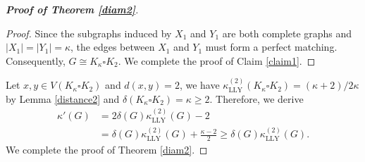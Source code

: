 \documentclass[11pt,bezier]{article}
\theoremstyle{definition}
\theoremstyle{definition}
\theoremstyle{nonumber}
\newtheorem*{theorem*}{Theorem}
\begin{document}
\begin{proof}[\bf{Proof of Theorem \ref{diam2}}]
\begin{proof}
Since the subgraphs induced by $X_1$ and $Y_1$ are both complete graphs and $|X_1|=|Y_1|=\kappa$, the edges between $X_1$ and $Y_1$ must form a perfect matching. Consequently, $G\cong K_{\kappa}\square K_2$.
We complete the proof of Claim \ref{claim1}.
\end{proof}

Let $x,y\in V(K_{\kappa}\square K_2)$ and $d(x,y)=2$, we have $\kappa_{\mathrm{LLY}}^{(2)}(K_{\kappa}\square K_2)=(\kappa+2)/2\kappa$ by Lemma \ref{distance2} and $\delta(K_{\kappa}\square K_2)=\kappa\geq2$.
Therefore, we derive
\begin{align*}
\kappa'(G) &= 2\delta(G)\kappa_{\mathrm{LLY}}^{(2)}(G)-2\\
&= \delta(G)\kappa_{\mathrm{LLY}}^{(2)}(G)+\frac{\kappa-2}{2} \geq \delta(G) \kappa_{\mathrm{LLY}}^{(2)}(G).
\end{align*}
We complete the proof of Theorem \ref{diam2}.
\end{proof}

\end{document}
